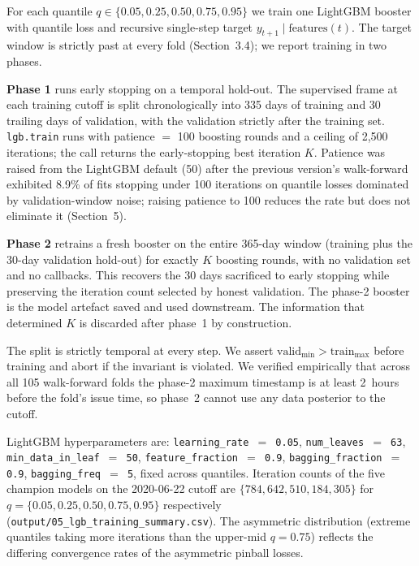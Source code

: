 \documentclass[11pt]{article}
\begin{document}
For each quantile $q \in \{0.05, 0.25, 0.50, 0.75, 0.95\}$ we train one
LightGBM \citep{ke2017lightgbm} booster with quantile loss and recursive
single-step target $y_{t+1} \mid \text{features}(t)$. The target window is
strictly past at every fold (Section~3.4); we report training in two
phases.

\textbf{Phase 1} runs early stopping on a temporal hold-out. The supervised
frame at each training cutoff is split chronologically into 335 days of
training and 30 trailing days of validation, with the validation
strictly after the training set. \texttt{lgb.train} runs with patience
$=$ 100 boosting rounds and a ceiling of 2,500 iterations; the call returns
the early-stopping best iteration $K$. Patience was raised from the LightGBM
default (50) after the previous version's walk-forward exhibited 8.9\% of
fits stopping under 100 iterations on quantile losses dominated by
validation-window noise; raising patience to 100 reduces the rate but does
not eliminate it (Section~5).

\textbf{Phase 2} retrains a fresh booster on the entire 365-day window
(training plus the 30-day validation hold-out) for exactly $K$ boosting
rounds, with no validation set and no callbacks. This recovers the 30 days
sacrificed to early stopping while preserving the iteration count selected
by honest validation. The phase-2 booster is the model artefact saved and
used downstream. The information that determined $K$ is discarded after
phase~1 by construction.

The split is strictly temporal at every step. We assert
$\text{valid}_{\min} > \text{train}_{\max}$ before training and abort if
the invariant is violated. We verified empirically that across all 105
walk-forward folds the phase-2 maximum timestamp is at least 2~hours
before the fold's issue time, so phase~2 cannot use any data posterior
to the cutoff.

LightGBM hyperparameters are: \texttt{learning\_rate $=$ 0.05},
\texttt{num\_leaves $=$ 63}, \texttt{min\_data\_in\_leaf $=$ 50},
\texttt{feature\_fraction $=$ 0.9}, \texttt{bagging\_fraction $=$ 0.9},
\texttt{bagging\_freq $=$ 5}, fixed across quantiles. Iteration counts of
the five champion models on the 2020-06-22 cutoff are
$\{784, 642, 510, 184, 305\}$ for $q = \{0.05, 0.25, 0.50, 0.75, 0.95\}$
respectively (\texttt{output/05\_lgb\_training\_summary.csv}). The
asymmetric distribution (extreme quantiles taking more iterations than the
upper-mid $q = 0.75$) reflects the differing convergence rates of the
asymmetric pinball losses.
\end{document}
